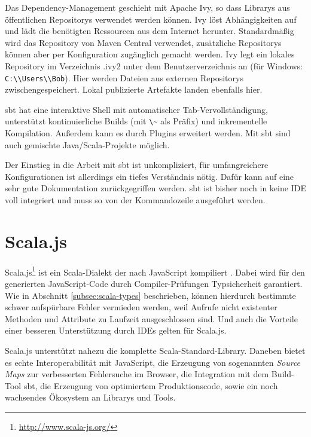 \documentclass[a4paper, 12pt, hidelinks, listof=totoc, listoftables=totoc, bibliography=totoc]{scrreprt}
\newcommand{\code}[1]{\lstinline[language=Scala, style=inline]|#1|}
\begin{document}
Das Dependency-Management geschieht mit Apache Ivy, so dass Librarys aus öffentlichen Repositorys verwendet werden können. Ivy löst Abhängigkeiten auf und lädt die benötigten Ressourcen aus dem Internet herunter. Standardmäßig wird das Repository von Maven Central verwendet, zusätzliche Repositorys können aber per Konfiguration zugänglich gemacht werden. Ivy legt ein lokales Repository im Verzeichnis .ivy2 unter dem Benutzerverzeichnis an (für Windows: \code{C:\\Users\\Bob}). Hier werden Dateien aus externen Repositorys zwischengespeichert. Lokal publizierte Artefakte landen ebenfalls hier.

sbt hat eine interaktive Shell mit automatischer Tab-Vervollständigung, unterstützt kontinuierliche Builds (mit \code{\~} als Präfix) und inkrementelle Kompilation. Außerdem kann es durch Plugins erweitert werden. Mit sbt sind auch gemischte Java/Scala-Projekte möglich.

Der Einstieg in die Arbeit mit sbt ist unkompliziert, für umfangreichere Konfigurationen ist allerdings ein tiefes Verständnis nötig. Dafür kann auf eine sehr gute Dokumentation zurückgegriffen werden. sbt ist bisher noch in keine \ac{IDE} voll integriert und muss so von der Kommandozeile ausgeführt werden.


\chapter{Scala.js}\label{chap:scala.js}

Scala.js\footnote{\url{http://www.scala-js.org/}} ist ein Scala-Dialekt der nach JavaScript kompiliert \cite[S. 1]{doeraene2013.TDI}. Dabei wird für den generierten JavaScript-Code durch Compiler-Prüfungen Typsicherheit garantiert. Wie in Abschnitt \ref{subsec:scala-types} beschrieben, können hierdurch bestimmte schwer aufspürbare Fehler vermieden werden, weil Aufrufe nicht existenter Methoden und Attribute zu Laufzeit ausgeschlossen sind. Und auch die Vorteile einer besseren Unterstützung durch \ac{IDE}s gelten für Scala.js.

Scala.js unterstützt nahezu die komplette Scala-Standard-Library. Daneben bietet es echte Interoperabilität mit JavaScript, die Erzeugung von sogenannten \emph{Source Maps} zur verbesserten Fehlersuche im Browser, die Integration mit dem Build-Tool sbt, die Erzeugung von optimiertem Produktionscode, sowie ein noch wachsendes Ökosystem an Librarys und Tools.
\end{document}
